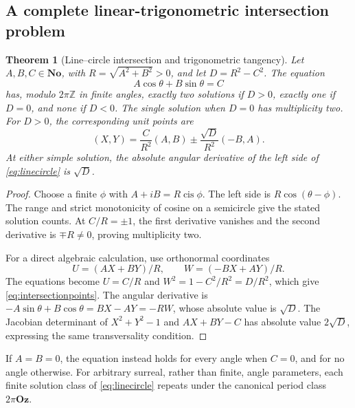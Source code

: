 \documentclass[11pt,letterpaper]{article}
\newtheorem{theorem}{Theorem}[section]
\theoremstyle{definition}
\theoremstyle{remark}
\newcommand{\No}{\mathbf{No}}
\newcommand{\Oz}{\mathbf{Oz}}
\newcommand{\Z}{\mathbb Z}\newcommand{\N}{\mathbb N}
\newcommand{\cis}{\operatorname{cis}}
\numberwithin{equation}{section}
\begin{document}
\subsection{A complete linear-trigonometric intersection problem}
\begin{theorem}[Line--circle intersection and trigonometric tangency]\label{thm:linecircle}
Let $A,B,C\in\No$, with $R=\sqrt{A^2+B^2}>0$, and let $D=R^2-C^2$. The equation
\begin{equation}\label{eq:linecircle}
 A\cos\theta+B\sin\theta=C
\end{equation}
has, modulo $2\pi\Z$ in finite angles, exactly two solutions if $D>0$, exactly one if $D=0$, and none if $D<0$. The single solution when $D=0$ has multiplicity two. For $D>0$, the corresponding unit points are
\begin{equation}\label{eq:intersectionpoints}
 (X,Y)=\frac{C}{R^2}(A,B)
 \mathbin{\pm}\frac{\sqrt D}{R^2}(-B,A).
\end{equation}
At either simple solution, the absolute angular derivative of the left side of \eqref{eq:linecircle} is $\sqrt D$.
\end{theorem}
\begin{proof}
Choose a finite $\phi$ with $A+iB=R\cis\phi$. The left side is $R\cos(\theta-\phi)$. The range and strict monotonicity of cosine on a semicircle give the stated solution counts. At $C/R=\pm1$, the first derivative vanishes and the second derivative is $\mp R\ne0$, proving multiplicity two.

For a direct algebraic calculation, use orthonormal coordinates
\[
 U=(AX+BY)/R,\qquad W=(-BX+AY)/R.
\]
The equations become $U=C/R$ and $W^2=1-C^2/R^2=D/R^2$, which give \eqref{eq:intersectionpoints}. The angular derivative is $-A\sin\theta+B\cos\theta=BX-AY=-RW$, whose absolute value is $\sqrt D$. The Jacobian determinant of $X^2+Y^2-1$ and $AX+BY-C$ has absolute value $2\sqrt D$, expressing the same transversality condition.
\end{proof}
If $A=B=0$, the equation instead holds for every angle when $C=0$, and for no angle otherwise. For arbitrary surreal, rather than finite, angle parameters, each finite solution class of \eqref{eq:linecircle} repeats under the canonical period class $2\pi\Oz$.
\end{document}
